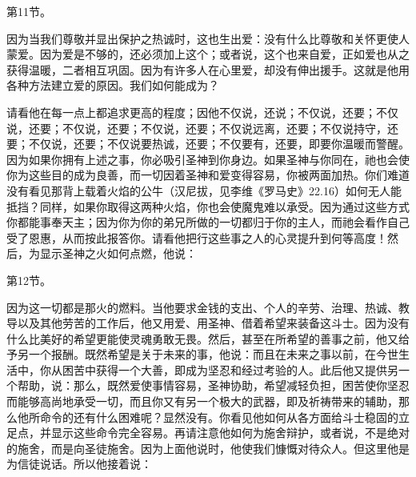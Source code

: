第11节。\par

因为当我们尊敬并显出保护之热诚时，这也生出爱：没有什么比尊敬和关怀更使人蒙爱。因为爱是不够的，还必须加上这个；或者说，这个也来自爱，正如爱也从之获得温暖，二者相互巩固。因为有许多人在心里爱，却没有伸出援手。这就是他用各种方法建立爱的原因。我们如何能成为？\par

请看他在每一点上都追求更高的程度；因他不仅说，还说；不仅说，还要；不仅说，还要；不仅说，还要；不仅说，还要；不仅说远离，还要；不仅说持守，还要；不仅说，还要；不仅说要热诚，还要；不仅要有，还要，即要你温暖而警醒。因为如果你拥有上述之事，你必吸引圣神到你身边。如果圣神与你同在，祂也会使你为这些目的成为良善，而一切因着圣神和爱变得容易，你被两面加热。你们难道没有看见那背上载着火焰的公牛（汉尼拔，见李维《罗马史》22.16）如何无人能抵挡？同样，如果你取得这两种火焰，你也会使魔鬼难以承受。因为通过这些方式你都能事奉天主；因为你为你的弟兄所做的一切都归于你的主人，而祂会看作自己受了恩惠，从而按此报答你。请看他把行这些事之人的心灵提升到何等高度！然后，为显示圣神之火如何点燃，他说：\par

第12节。\par

因为这一切都是那火的燃料。当他要求金钱的支出、个人的辛劳、治理、热诚、教导以及其他劳苦的工作后，他又用爱、用圣神、借着希望来装备这斗士。因为没有什么比美好的希望更能使灵魂勇敢无畏。然后，甚至在所希望的善事之前，他又给予另一个报酬。既然希望是关于未来的事，他说：而且在未来之事以前，在今世生活中，你从困苦中获得一个大善，即成为坚忍和经过考验的人。此后他又提供另一个帮助，说：那么，既然爱使事情容易，圣神协助，希望减轻负担，困苦使你坚忍而能够高尚地承受一切，而且你又有另一个极大的武器，即及祈祷带来的辅助，那么他所命令的还有什么困难呢？显然没有。你看见他如何从各方面给斗士稳固的立足点，并显示这些命令完全容易。再请注意他如何为施舍辩护，或者说，不是绝对的施舍，而是向圣徒施舍。因为上面他说时，他使我们慷慨对待众人。但这里他是为信徒说话。所以他接着说：\par

